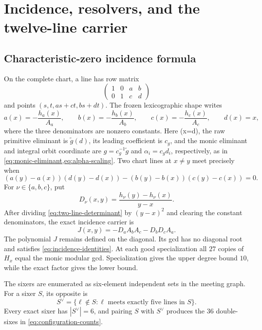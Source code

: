 \section{Incidence, resolvers, and the twelve-line carrier}
\label{app:incidence-resolvers}

\subsection{Characteristic-zero incidence formula}

On the complete chart, a line has row matrix
\[
 \begin{pmatrix}1&0&a&b\\0&1&c&d\end{pmatrix}
\]
and points \((s,t,as+ct,bs+dt)\).  The frozen lexicographic shape writes
\[
 a(x)=-\frac{h_a(x)}{A_a},\qquad
 b(x)=-\frac{h_b(x)}{A_b},\qquad
 c(x)=-\frac{h_c(x)}{A_c},\qquad d(x)=x,
\]
where the three denominators are nonzero constants.  Here (x=d), the raw
primitive eliminant is \(\widetilde g(d)\), its leading coefficient is
\(c_g\), and the monic eliminant and integral orbit coordinate are
\(g=c_g^{-1}\widetilde g\) and \(\alpha_i=c_gd_i\), respectively, as in
\cref{eq:monic-eliminant,eq:alpha-scaling}.  Two chart lines at
\(x\ne y\) meet precisely when
\begin{equation}
 (a(y)-a(x))(d(y)-d(x))
 -(b(y)-b(x))(c(y)-c(x))=0.
\label{eq:two-line-determinant}
\end{equation}
For \(\nu\in\{a,b,c\}\), put
\[
 D_\nu(x,y)=\frac{h_\nu(y)-h_\nu(x)}{y-x}.
\]
After dividing \cref{eq:two-line-determinant} by \((y-x)^2\) and clearing
the constant denominators, the exact incidence carrier is
\begin{equation}
 J(x,y)=-D_aA_bA_c-D_bD_cA_a.
\label{eq:divided-J}
\end{equation}
The polynomial \(J\) remains defined on the diagonal.  Its gcd has no
diagonal root and satisfies \cref{eq:incidence-identities}.  At each good
specialization all \(27\) copies of \(H_x\) equal the monic modular gcd.
Specialization gives the upper degree bound \(10\), while the exact factor
gives the lower bound.

The sixers are enumerated as six-element independent sets in the meeting
graph.  For a sixer \(S\), its opposite is
\[
 S^\vee=\{\ell\notin S:\ell\text{ meets exactly five lines in }S\}.
\]
Every exact sixer has \(|S^\vee|=6\), and pairing \(S\) with \(S^\vee\)
produces the \(36\) double-sixes in \cref{eq:configuration-counts}.

